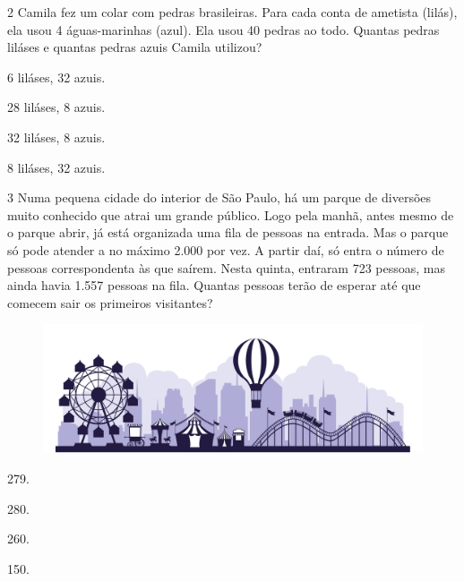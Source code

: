 \num{2} Camila fez um colar com pedras brasileiras. 
Para cada conta de ametista (lilás), ela usou 4 águas-marinhas (azul).
Ela usou 40 pedras ao todo. Quantas pedras liláses e quantas pedras azuis Camila utilizou?

\begin{multicols}{2}
\begin{escolha}
\item 6 liláses, 32 azuis.

\item 28 liláses, 8 azuis. 

\item 32 liláses, 8 azuis.

\item 8 liláses, 32 azuis.
\end{escolha}
\end{multicols}

\num{3} Numa pequena cidade do interior de São Paulo, há um parque de diversões muito conhecido que atrai um grande público. Logo pela manhã, antes mesmo de o parque abrir, já está organizada uma fila de pessoas na entrada. Mas o parque só pode atender a no máximo 2.000 por vez. A partir daí, só entra o número de pessoas correspondenta às que saírem. Nesta quinta, entraram 723 pessoas, mas ainda havia 1.557 pessoas na fila. Quantas pessoas terão de esperar até que comecem sair os primeiros visitantes?

\begin{figure}[htpb!]
\centering
\includegraphics[width=.7\textwidth]{media/image16a.jpeg}
\end{figure}

\begin{multicols}{2}
\begin{escolha}
\item 279.

\item 280.

\item 260.

\item 150.
\end{escolha}
\end{multicols}



